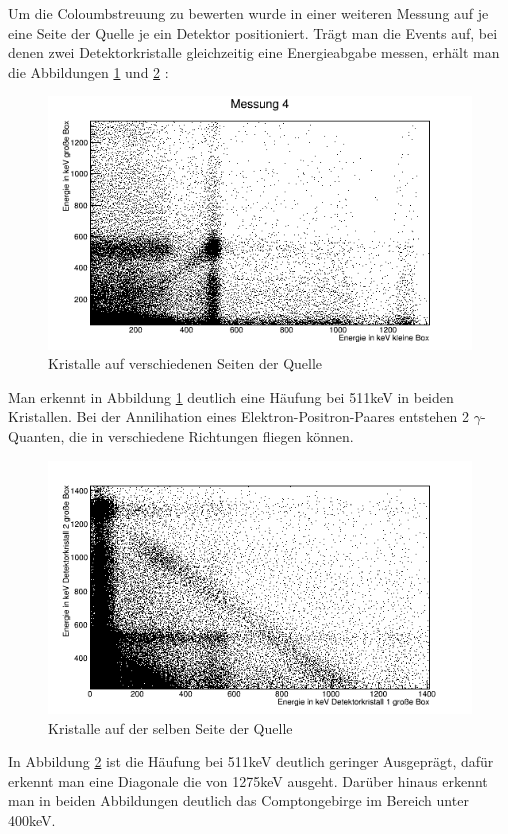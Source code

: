 \documentclass[a4paper,14pt,twoside]{article}
\begin{document}
Um die Coloumbstreuung zu bewerten wurde in einer weiteren Messung auf je eine Seite der Quelle je ein Detektor positioniert. Trägt man die Events auf, bei denen zwei Detektorkristalle gleichzeitig eine Energieabgabe messen, erhält man die Abbildungen \ref{l11} und \ref{l12} :\\
\begin{figure}[H]
	\begin{center}
		\includegraphics[width=\textwidth]{Vergleichgrosklein.png}
		\caption{Kristalle auf verschiedenen Seiten der Quelle}
		\label{l11}
	\end{center}
\end{figure}
Man erkennt in Abbildung \ref{l11} deutlich eine Häufung bei 511keV in beiden Kristallen. Bei der Annilihation eines Elektron-Positron-Paares entstehen 2 $\gamma$-Quanten, die in verschiedene Richtungen fliegen können. 
\begin{figure}[H]
	\begin{center}
		\includegraphics[width=\textwidth]{Vergleichgrosgros1.png}
		\caption{Kristalle auf der selben Seite der Quelle}
		\label{l12}
	\end{center}
\end{figure}
In Abbildung \ref{l12} ist die Häufung bei 511keV deutlich geringer Ausgeprägt, dafür erkennt man eine Diagonale die von 1275keV ausgeht. Darüber hinaus erkennt man in beiden Abbildungen deutlich das Comptongebirge im Bereich unter 400keV.
\end{document}
